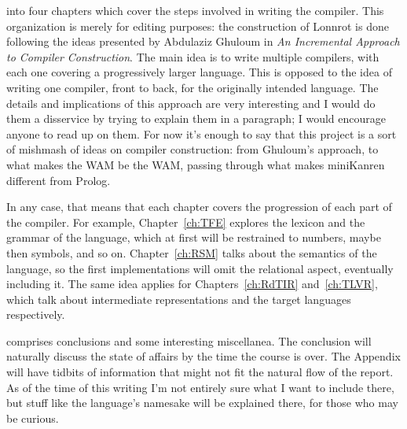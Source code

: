  into four chapters which cover the steps involved in writing
the compiler. This organization is merely for editing purposes: the construction of Lonnrot is
done following the ideas presented by Abdulaziz Ghuloum in \textit{An Incremental Approach to Compiler
  Construction}.
The main idea is to write multiple compilers, with each one covering a progressively larger language.
This is opposed to the idea of writing one compiler, front to back, for the originally intended
language. The details and implications of this approach are very interesting and I would
do them a disservice by trying to explain them in a paragraph; I would encourage anyone
to read up on them. For now it's enough to say that this project is a sort of mishmash of ideas
on compiler construction: from Ghuloum's approach, to what makes the WAM be the WAM, passing
through what makes miniKanren different from Prolog.

In any case, that means that each chapter covers the progression of each part of the compiler.
For example, Chapter~\ref{ch:TFE} explores the lexicon and the grammar of the language, which
at first will be restrained to numbers, maybe then symbols, and so on. Chapter~\ref{ch:RSM} talks
about the semantics of the language, so the first implementations will omit the relational aspect,
eventually including it. The same idea applies for Chapters~\ref{ch:RdTIR} and~\ref{ch:TLVR}, which
talk about intermediate representations and the target languages respectively.

 comprises conclusions and some interesting
miscellanea. The conclusion will naturally discuss the state of affairs by the time the course is over.
The Appendix will have tidbits of information that might not fit the natural flow of the report.
As of the time of this writing I'm not entirely sure what I want to include there, but
stuff like the language's namesake will be explained there, for those who may be curious.

